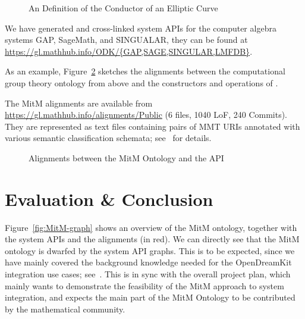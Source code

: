 \documentclass{deliverablereport}
\begin{document}
\begin{figure}[ht]\centering
  \caption{An \sTeX Definition of the Conductor of an Elliptic
    Curve}\label{fig:conductor}
\end{figure}


We have generated and cross-linked system APIs for the computer algebra systems GAP,
SageMath, and SINGUALAR, they can be found at
\url{https://gl.mathhub.info/ODK/{GAP,SAGE,SINGULAR,LMFDB}}.

As an example, Figure~\ref{fig:cgtontology} sketches the alignments between the
computational group theory ontology from above and the constructors and operations of
\GAP.

The MitM alignments are available from \url{https://gl.mathhub.info/alignments/Public} (6
files, 1040 LoF, 240 Commits). They are represented as text files containing pairs of MMT
URIs annotated with various semantic classification schemata;
see~\cite{MueGauKal:cacfms17} for details.
\begin{figure}[ht]\centering
  \caption{Alignments between the MitM Ontology and the \GAP API}\label{fig:cgtontology}
\end{figure}

\section{Evaluation \& Conclusion}\label{sec:concl}

Figure~\ref{fig:MitM-graph} shows an overview of the MitM ontology, together with the
system APIs and the alignments (in red). We can directly see that the MitM ontology is
dwarfed by the system API graphs. This is to be expected, since we have mainly covered the
background knowledge needed for the OpenDreamKit integration use cases;
see~\cite{ODK-D6.5}. This is in sync with the overall project plan, which mainly wants to
demonstrate the feasibility of the MitM approach to system integration, and expects the
main part of the MitM Ontology to be contributed by the mathematical community.
\end{document}
